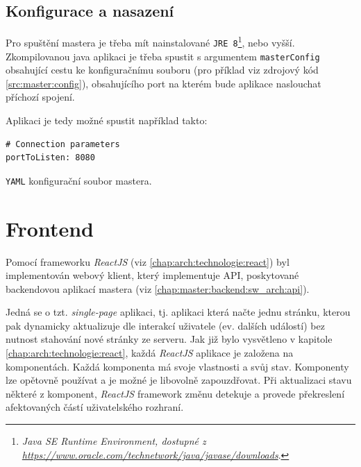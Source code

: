\subsection{Konfigurace a nasazení}
Pro spuštění mastera je třeba mít nainstalované \texttt{JRE 8}\footnote{\textit{Java SE Runtime Environment, dostupné z\\\url{https://www.oracle.com/technetwork/java/javase/downloads}}.}, nebo vyšší.
Zkompilovanou java aplikaci je třeba spustit s argumentem \texttt{masterConfig} obsahující cestu ke konfiguračnímu souboru (pro příklad viz zdrojový kód \ref{src:master:config}), obsahujícího port na kterém bude aplikace naslouchat příchozí spojení.

Aplikaci je tedy možné spustit například takto: 

\begin{code}[h]
  \begin{verbatim}
# Connection parameters
portToListen: 8080
\end{verbatim}
\caption{\texttt{YAML} konfigurační soubor mastera.}
\label{src:master:config}
\end{code}

\section{Frontend}\label{chap:master:frontend}
Pomocí frameworku \textit{ReactJS} (viz \ref{chap:arch:technologie:react}) byl implementován webový klient, který implementuje API, poskytované backendovou aplikací mastera (viz \ref{chap:master:backend:sw_arch:api}). 

Jedná se o tzt. \textit{single-page} aplikaci, tj. aplikaci která načte jednu stránku, kterou pak dynamicky aktualizuje dle interakcí uživatele (ev. dalších událostí) bez nutnost stahování nové stránky ze serveru. Jak již bylo vysvětleno v kapitole \ref{chap:arch:technologie:react}, každá \textit{ReactJS} aplikace je založena na komponentách. Každá komponenta má svoje vlastnosti a svůj stav. Komponenty lze opětovně používat a je možné je libovolně zapouzdřovat. Při aktualizaci stavu některé z komponent, \textit{ReactJS} framework změnu detekuje a provede překreslení afektovaných částí uživatelského rozhraní.

